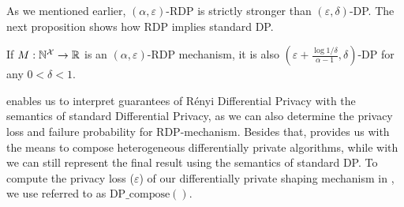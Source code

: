 As we mentioned earlier, $(\alpha, \varepsilon)$-RDP is strictly stronger than $(\varepsilon, \delta)$-DP. 
The next proposition shows how RDP implies standard DP.
\begin{proposition}\label{prop:rdp-better-than-dp}
  If $M: \mathbb{N}^\mathcal{X} \rightarrow \mathbb{R}$ is an $(\alpha, \varepsilon)$-RDP mechanism, it is also $(\varepsilon + \frac{\log 1/\delta}{\alpha-1}, \delta)$-DP for any $0 < \delta < 1$. 
\end{proposition}
\noindent {} enables us to interpret guarantees of R\'enyi Differential Privacy with the semantics of standard Differential Privacy, as we can also determine the privacy loss and failure probability for RDP-mechanism. 
Besides that,  provides us with the means to compose heterogeneous differentially private algorithms, while with  we can still represent the final result using the semantics of standard DP. 
To compute the privacy loss (\ie $\varepsilon$) of our differentially private shaping mechanism in , we use  referred to as $\textrm{DP\_compose}()$.